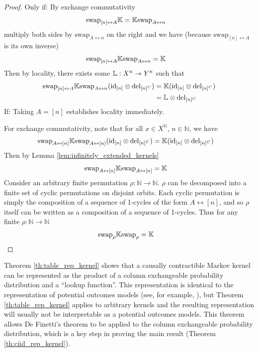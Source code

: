 \begin{proof}
Only if:
By exchange commutativity
\begin{align}
    \text{swap}_{[n]\leftrightarrow A} \mathbb{K} &= \mathbb{K} \text{swap}_{A\leftrightarrow n}
\end{align}
multiply both sides by $\text{swap}_{A\leftrightarrow n}$ on the right and we have (because $\text{swap}_{[n]\leftrightarrow A}$ is its own inverse)
\begin{align}
        \text{swap}_{[n]\leftrightarrow A} \mathbb{K}\text{swap}_{A\leftrightarrow n} &= \mathbb{K}
\end{align}
Then by locality, there exists some $\mathbb{L}:X^n\rightarrowtriangle Y^n$ such that
\begin{align}
    \text{swap}_{[n]\leftrightarrow A} \mathbb{K} \text{swap}_{A\leftrightarrow n} (\text{id}_{[n]}\otimes \text{del}_{[n]^C}) &= \mathbb{K} (\text{id}_{[n]}\otimes \text{del}_{[n]^C})\\
    &=\mathbb{L}\otimes \mathrm{del}_{[n]^C}
\end{align}
If:
Taking $A=[n]$ establishes locality immediately.

For exchange commutativity, note that for all $x\in X^{\mathbb{N}}$, $n\in\mathbb{N}$, we have
\begin{align}
    \text{swap}_{A\leftrightarrow [n]} \mathbb{K} \text{swap}_{A\leftrightarrow [n]} (\text{id}_{[n]}\otimes \text{del}_{[n]^C}) &= \mathbb{K}  (\text{id}_{[n]}\otimes \text{del}_{[n]^C})
\end{align}
Then by Lemma \ref{lem:infinitely_extended_kernels}
\begin{align}
    \text{swap}_{A\leftrightarrow [n]} \mathbb{K} \text{swap}_{A\leftrightarrow [n]} &= \mathbb{K}
\end{align}
Consider an arbitrary finite permutation $\rho:\mathbb{N}\to \mathbb{N}$. $\rho$ can be decomposed into a finite set of cyclic permutations on disjoint orbits. Each cyclic permutation is simply the composition of a sequence of 1-cycles of the form $A\leftrightarrow [n]$, and so $\rho$ itself can be written as a composition of a sequence of 1-cycles. Thus for any finite $\rho:\mathbb{N}\to\mathbb{N}$
\begin{align}
    \text{swap}_{\rho} \mathbb{K} \text{swap}_{\rho} &= \mathbb{K}
\end{align}
\end{proof}

Theorem \ref{th:table_rep_kernel} shows that a causally contractible Markov kernel can be represented as the product of a column exchangeable probability distribution and a ``lookup function''. This representation is identical to the representation of potential outcomes models (see, for example, \citet{rubin_causal_2005}), but Theorem \ref{th:table_rep_kernel} applies to arbitrary kernels and the resulting representation will usually not be interpretable as a potential outcomes models. This theorem allows De Finetti's theorem to be applied to the column exchangeable probability distribution, which is a key step in proving the main result (Theorem \ref{th:ciid_rep_kernel}).

